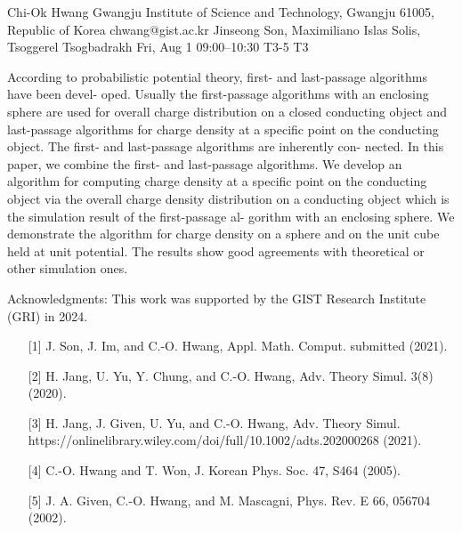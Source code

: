 \begin{talk}
  {Chi-Ok Hwang}%
  {Gwangju Institute of Science and Technology, Gwangju 61005, Republic of Korea}%
  {chwang@gist.ac.kr}%
  {Jinseong Son, Maximiliano Islas Solis, Tsoggerel Tsogbadrakh}%
  {}%
  {}%
  {Fri, Aug 1 09:00–10:30}%
  {T3-5}%
  {T3}%
  
				
			
According to probabilistic potential theory, first- and last-passage algorithms have been devel-
oped. Usually the first-passage algorithms with an enclosing sphere are used for overall charge
distribution on a closed conducting object and last-passage algorithms for charge density at a
specific point on the conducting object. The first- and last-passage algorithms are inherently con-
nected. In this paper, we combine the first- and last-passage algorithms. We develop an algorithm
for computing charge density at a specific point on the conducting object via the overall charge
density distribution on a conducting object which is the simulation result of the first-passage al-
gorithm with an enclosing sphere. We demonstrate the algorithm for charge density on a sphere
and on the unit cube held at unit potential. The results show good agreements with theoretical or
other simulation ones.


\medskip

Acknowledgments: This work was supported by the GIST Research Institute (GRI) in 2024.
\begin{enumerate}
	\item[{[1]}] J. Son, J. Im, and C.-O. Hwang, Appl. Math. Comput. submitted (2021).
	\item[{[2]}] H. Jang, U. Yu, Y. Chung, and C.-O. Hwang, Adv. Theory Simul. 3(8) (2020).
	\item[{[3]}] H. Jang, J. Given, U. Yu, and C.-O. Hwang, Adv. Theory Simul.
	https://onlinelibrary.wiley.com/doi/full/10.1002/adts.202000268 (2021).
	\item[{[4]}] C.-O. Hwang and T. Won, J. Korean Phys. Soc. 47, S464 (2005).
	\item[{[5]}] J. A. Given, C.-O. Hwang, and M. Mascagni, Phys. Rev. E 66, 056704 (2002).
\end{enumerate}


\end{talk}

